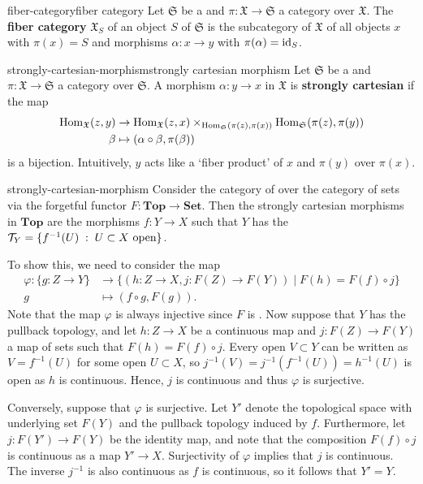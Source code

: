\begin{topic}{fiber-category}{fiber category}
    Let $\mathfrak{S}$ be a  and $\pi : \mathfrak{X} \to \mathfrak{S}$ a category over $\mathfrak{X}$. The \textbf{fiber category} $\mathfrak{X}_S$ of an object $S$ of $\mathfrak{S}$ is the subcategory of $\mathfrak{X}$ of all objects $x$ with $\pi(x) = S$ and morphisms $\alpha : x \to y$ with $\pi(\alpha) = \textup{id}_S$.
\end{topic}

\begin{topic}{strongly-cartesian-morphism}{strongly cartesian morphism}
    Let $\mathfrak{S}$ be a  and $\pi : \mathfrak{X} \to \mathfrak{S}$ a category over $\mathfrak{S}$. A morphism $\alpha : y \to x$ in $\mathfrak{X}$ is \textbf{strongly cartesian} if the map
    \[ \begin{aligned}
        \operatorname{Hom}_\mathfrak{X}(z, y) &\to \operatorname{Hom}_\mathfrak{X}(z, x) \times_{\operatorname{Hom}_\mathfrak{S}(\pi(z), \pi(x))} \operatorname{Hom}_\mathfrak{S}(\pi(z), \pi(y)) \\
        \beta &\mapsto (\alpha \circ \beta, \pi(\beta))
    \end{aligned} \]
    is a bijection. Intuitively, $y$ acts like a `fiber product' of $x$ and $\pi(y)$ over $\pi(x)$.
\end{topic}

\begin{example}{strongly-cartesian-morphism}
    Consider the category of  over the category of sets via the forgetful functor $F : \textbf{Top} \to \textbf{Set}$. Then the strongly cartesian morphisms in $\textbf{Top}$ are the morphisms $f : Y \to X$ such that $Y$ has the  $\mathcal{T}_Y = \{ f^{-1}(U) \;:\; U \subset X \textup{ open} \}$.
    
    To show this, we need to consider the map
    \[ \begin{aligned}
        \varphi : \{ g : Z \to Y \} &\to \{ (h : Z \to X, j : F(Z) \to F(Y)) \mid F(h) = F(f) \circ j \} \\
        g &\mapsto (f \circ g, F(g)) .
    \end{aligned} \]
    Note that the map $\varphi$ is always injective since $F$ is . Now suppose that $Y$ has the pullback topology, and let $h : Z \to X$ be a continuous map and $j : F(Z) \to F(Y)$ a map of sets such that $F(h) = F(f) \circ j$. Every open $V \subset Y$ can be written as $V = f^{-1}(U)$ for some open $U \subset X$, so $j^{-1}(V) = j^{-1}(f^{-1}(U)) = h^{-1}(U)$ is open as $h$ is continuous. Hence, $j$ is continuous and thus $\varphi$ is surjective.
    
    Conversely, suppose that $\varphi$ is surjective. Let $Y'$ denote the topological space with underlying set $F(Y)$ and the pullback topology induced by $f$. Furthermore, let $j : F(Y') \to F(Y)$ be the identity map, and note that the composition $F(f) \circ j$ is continuous as a map $Y' \to X$. Surjectivity of $\varphi$ implies that $j$ is continuous. The inverse $j^{-1}$ is also continuous as $f$ is continuous, so it follows that $Y' = Y$.
\end{example}


